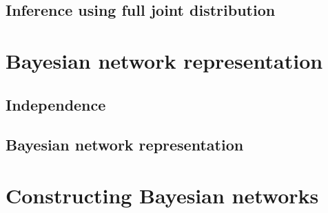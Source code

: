 \documentclass[12pt,a4paper,twoside]{book}
\begin{document}
\section{Inference using full joint distribution}

\label{s_1_2}

\chapter{Bayesian network representation}

\label{c_2}

\section{Independence}

\label{s_2_1}

\section{Bayesian network representation}

\label{s_2_2}

\chapter{Constructing Bayesian networks}

\label{c_3}
\end{document}
